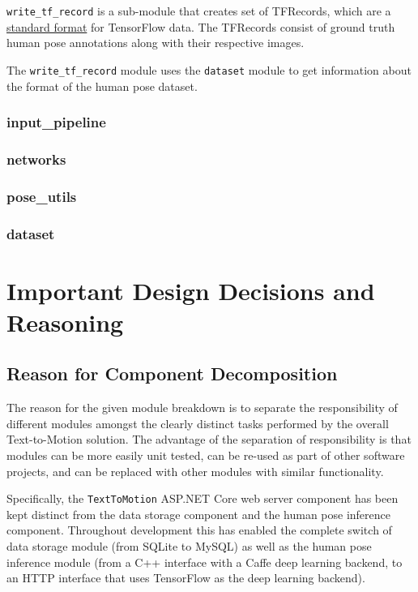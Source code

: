 \documentclass{scrreprt}
\begin{document}
\verb|write_tf_record| is a sub-module that creates set of TFRecords, which are
a \href{https://www.tensorflow.org/programmers_guide/reading_data#file_formats}
{standard format} for TensorFlow data. The TFRecords consist of ground truth
human pose annotations along with their respective images.

The \verb|write_tf_record| module uses the \verb|dataset| module to get
information about the format of the human pose dataset.

\subsection{input\_pipeline}

\subsection{networks}

\subsection{pose\_utils}

\subsection{dataset}

\chapter{Important Design Decisions and Reasoning}

\section{Reason for Component Decomposition}

The reason for the given module breakdown is to separate the responsibility of
different modules amongst the clearly distinct tasks performed by the overall
Text-to-Motion solution. The advantage of the separation of responsibility is
that modules can be more easily unit tested, can be re-used as part of other
software projects, and can be replaced with other modules with similar
functionality.

Specifically, the \verb|TextToMotion| ASP.NET Core web server component has
been kept distinct from the data storage component and the human pose inference
component. Throughout development this has enabled the complete switch of data
storage module (from SQLite to MySQL) as well as the human pose inference
module (from a C++ interface with a Caffe deep learning backend, to an HTTP
interface that uses TensorFlow as the deep learning backend).
\end{document}
